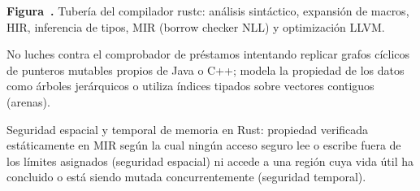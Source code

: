\documentclass{book}
\newcounter{studiumfigure}
\begin{document}
\begin{minipage}{\linewidth}
%
\fi
\fi
\endgroup
\par\nopagebreak
{\small {}\label{fig:fig-rust-compiler-pipeline}\textbf{Figura~\thestudiumfigure.} Tubería del compilador rustc: análisis sintáctico, expansión de macros, HIR, inferencia de tipos, MIR (borrow checker NLL) y optimización LLVM.\par}
\end{minipage}
\par\vspace{\baselineskip}

\begin{tcolorbox}[title={Consejo}, studiumtip, breakable]

No luches contra el comprobador de préstamos intentando replicar grafos cíclicos de punteros mutables propios de Java o C++; modela la propiedad de los datos como árboles jerárquicos o utiliza índices tipados sobre vectores contiguos (arenas).
\end{tcolorbox}

\begin{tcolorbox}[title={Definición}, studiumdef, breakable]

Seguridad espacial y temporal de memoria en Rust: propiedad verificada estáticamente en MIR según la cual ningún acceso seguro lee o escribe fuera de los límites asignados (seguridad espacial) ni accede a una región cuya vida útil ha concluido o está siendo mutada concurrentemente (seguridad temporal).
\end{tcolorbox}
\end{document}
